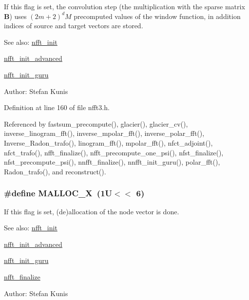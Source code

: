 If this flag is set, the convolution step (the multiplication with the sparse matrix $\mathbf{B}$) uses $(2m+2)^dM$ precomputed values of the window function, in addition indices of source and target vectors are stored. 

\begin{Desc}
\item[See also:]\hyperlink{group__nfft_ga7}{nfft\_\-init} 

\hyperlink{group__nfft_ga8}{nfft\_\-init\_\-advanced} 

\hyperlink{group__nfft_ga9}{nfft\_\-init\_\-guru} \end{Desc}
\begin{Desc}
\item[Author:]Stefan Kunis \end{Desc}


Definition at line 160 of file nfft3.h.

Referenced by fastsum\_\-precompute(), glacier(), glacier\_\-cv(), inverse\_\-linogram\_\-fft(), inverse\_\-mpolar\_\-fft(), inverse\_\-polar\_\-fft(), Inverse\_\-Radon\_\-trafo(), linogram\_\-fft(), mpolar\_\-fft(), nfct\_\-adjoint(), nfct\_\-trafo(), nfft\_\-finalize(), nfft\_\-precompute\_\-one\_\-psi(), nfst\_\-finalize(), nfst\_\-precompute\_\-psi(), nnfft\_\-finalize(), nnfft\_\-init\_\-guru(), polar\_\-fft(), Radon\_\-trafo(), and reconstruct().\hypertarget{group__nfft_ga22}{
\subsubsection[MALLOC\_\-X]{\setlength{\rightskip}{0pt plus 5cm}\#define MALLOC\_\-X~(1U$<$$<$ 6)}}
\label{group__nfft_ga22}


If this flag is set, (de)allocation of the node vector is done. 

\begin{Desc}
\item[See also:]\hyperlink{group__nfft_ga7}{nfft\_\-init} 

\hyperlink{group__nfft_ga8}{nfft\_\-init\_\-advanced} 

\hyperlink{group__nfft_ga9}{nfft\_\-init\_\-guru} 

\hyperlink{group__nfft_ga15}{nfft\_\-finalize} \end{Desc}
\begin{Desc}
\item[Author:]Stefan Kunis \end{Desc}


